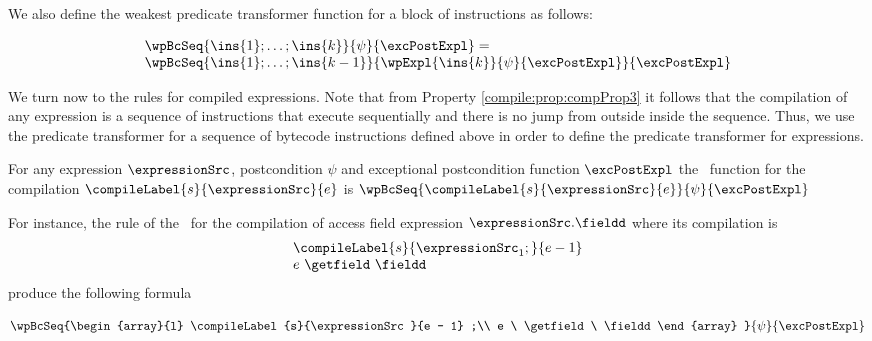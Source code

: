 We also define the weakest predicate transformer function  for a block of instructions as follows:

\begin{wpSeq}\label{pog:wpBc:wpSeq}
     $$ \begin{array}{l} 
              \wpBcSeq{ \ins{1};\ldots;\ins{k}}{ \psi  } { \excPostExpl } =\\
              \wpBcSeq{\ins{1};\ldots;\ins{k -1} }{ \wpExpl{ \ins{k} }{ \psi }{ \excPostExpl} }{\excPostExpl} 
        \end{array}$$ 

\end{wpSeq}



We turn now to the rules for compiled expressions. Note that from Property \ref{compile:prop:compProp3}   it follows that 
the compilation of any expression is a sequence of instructions that execute sequentially and there is no jump from outside inside 
the sequence. Thus, we use 
the predicate transformer  for a sequence of bytecode instructions defined above in order to define 
the predicate transformer for  expressions. 

\begin{wpExpr} \label{wpExpr}
               For any expression $\expressionSrc$, postcondition $\psi$ and exceptional postcondition function
               $\excPostExpl$ the \wpName \ function for the compilation $\compileLabel{s}{\expressionSrc}{e}$  is
               $ \wpBcSeq{\compileLabel{s}{\expressionSrc}{e} }{ \psi  } { \excPostExpl }  $
 \end{wpExpr}

For instance, the  rule of the \wpName  \ for the compilation of access  field expression $\expressionSrc.\fieldd $ 
where its compilation is 
$$\begin{array}{l}
    \compileLabel{s}{ \expressionSrc_1;}{e - 1}\\
     e \ \getfield \ \fieldd \\
 \end{array}
$$
  produce the following formula 
 
$$  \wpBcSeq{\begin{array}{l}
	              \compileLabel{s}{\expressionSrc }{e - 1} ;\\
	              e \ \getfield \ \fieldd 
	           \end{array} }{ \psi  } { \excPostExpl } $$	

